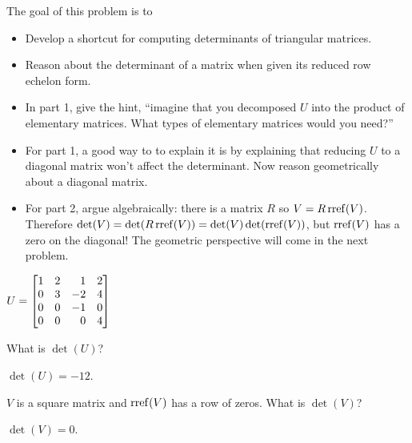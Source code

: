 \documentclass{workbook}
\newcommand{\displayonlynewpage}{\begin{displayonly}\newpage\end{displayonly}}
\newcommand{\bookonlynewpage}{\begin{bookonly}\newpage\end{bookonly}}
\begin{document}
\begin{slide}
	\bookonlynewpage
	\displayonlynewpage
	\question
	\begin{annotation}
		\begin{goals}

			The goal of this problem is to
			\begin{itemize}
				\item Develop a shortcut for computing determinants of triangular matrices.
				\item Reason about the determinant of a matrix when given its reduced
					row echelon form.
			\end{itemize}
		\end{goals}

		\begin{notes}
			\begin{itemize}
				\item In part 1, give the hint, ``imagine that you decomposed
					$U$ into the product of elementary matrices. What types of
					elementary matrices would you need?''
				\item For part 1, a good way to to explain it is by explaining that
					reducing $U$ to a diagonal matrix won't affect the determinant.
					Now reason geometrically about a diagonal matrix.
				\item For part 2, argue algebraically: there is a matrix $R$ so $V=R\operatorname{rref}(V)$.
					Therefore $\det(V)=\det(R\operatorname{rref}(V))=\det(V)\det(\operatorname{rref}(V))$, but $\operatorname{rref}(V)$
					has a zero on the diagonal! The geometric perspective will come in the next problem.
			\end{itemize}
		\end{notes}
	\end{annotation}
	$U=\mat{1&2&1&2\\0&3&-2&4\\0&0&-1&0\\0&0&0&4}$
	\begin{parts}
		\item What is $\det(U)$?
			\begin{solution}
				$\det(U)=-12$.
			\end{solution}
		\item $V$ is a square matrix and $\operatorname{rref}(V)$ has a row of zeros.
			What is $\det(V)$?
			\begin{solution}
				$\det(V)=0$.
			\end{solution}
	\end{parts}


\end{slide}
\end{document}
